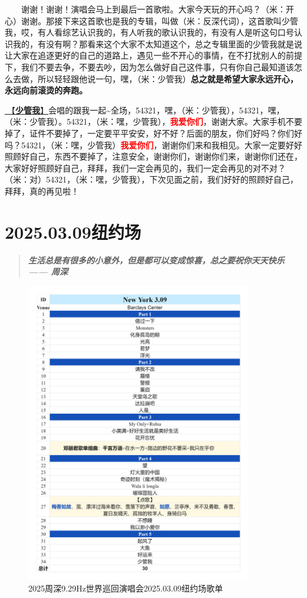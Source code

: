 \documentclass[]{ctexbook}
\begin{document}
  谢谢！谢谢！演唱会马上到最后一首歌啦。大家今天玩的开心吗？（米：开心）谢谢。那接下来这首歌也是我的专辑，叫做（米：反深代词），这首歌叫少管我，哎，有人看综艺认识我的，有人听我的歌认识我的，有没有人是听这句口号认识我的，有没有啊？那看来这个大家不太知道这个，总之专辑里面的少管我就是说让大家在追逐更好的自己的道路上，遇见一些不开心的事情，在不打扰别人的前提下，我们不要去争，不要去吵，因为怎么做好自己这件事，只有你自己最知道该怎么去做，所以轻轻跟他说一句，嘿，（米：少管我）\textbf{总之就是希望大家永远开心，永远向前滚烫的奔跑。}

\hyperref[watch-ur-manners]{🎵【\textbf{少管我}】}会唱的跟我一起\textasciitilde 全场，54321，嘿，（米：少管我），54321，嘿，（米：少管我）。54321，（米：嘿，少管我），\textbf{\textcolor{red}{我爱你们}}，谢谢大家。大家手机不要掉了，证件不要掉了，一定要平平安安，好不好？后面的朋友，你们好吗？你们好吗？54321，（米：嘿，少管我）\textbf{\textcolor{red}{我爱你们}}，谢谢你们来和我相见。大家一定要好好照顾好自己，东西不要掉了，注意安全，谢谢你们，谢谢你们来，谢谢你们还在，大家好好照顾好自己，拜拜，我们一定会再见的，我们一定会再见的对不对？（米：对）54321，（米：嘿，少管我），下次见面之前，我们好好的照顾好自己，拜拜，真的再见啦！

\chapter{2025.03.09纽约场}\label{NewYork-20250309}

\begin{quote}
\textbf{\emph{生活总是有很多的小意外，但是都可以变成惊喜，总之要祝你天天快乐------ 周深}}
\end{quote}

\begin{figure}

{\centering \includegraphics[width=280pt]{img/playlists/playlists-newyork-20250309} 

}

\caption{2025周深9.29Hz世界巡回演唱会2025.03.09纽约场歌单}\label{fig:unnamed-chunk-183}
\end{figure}
\end{document}

